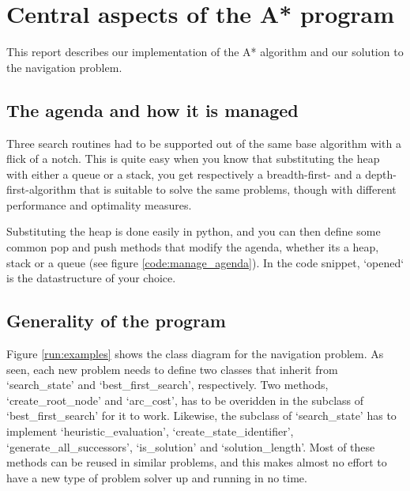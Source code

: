 \section{Central aspects of the A* program}
This report describes our implementation of the A* algorithm and our solution to the navigation problem.

\subsection{The agenda and how it is managed}

Three search routines had to be supported out of the same base algorithm with a flick of a notch. This is quite easy when you know that substituting the heap with either a queue or a stack, you get respectively a breadth-first- and a depth-first-algorithm that is suitable to solve the same problems, though with different performance and optimality measures.

Substituting the heap is done easily in python, and you can then define some common pop and push methods that modify the agenda, whether its a heap, stack or a queue (see figure \ref{code:manage_agenda}). In the code snippet, `opened` is the datastructure of your choice.



\subsection{Generality of the program}



Figure \ref{run:examples} shows the class diagram for the navigation problem. As seen, each new problem needs to define two classes that inherit from `search\_state' and `best\_first\_search', respectively. Two methods, `create\_root\_node' and `arc\_cost', has to be overidden in the subclass of `best\_first\_search' for it to work. Likewise, the subclass of `search\_state' has to implement `heuristic\_evaluation', `create\_state\_identifier', `generate\_all\_successors', `is\_solution' and `solution\_length'. Most of these methods can be reused in similar problems, and this makes almost no effort to have a new type of problem solver up and running in no time.

